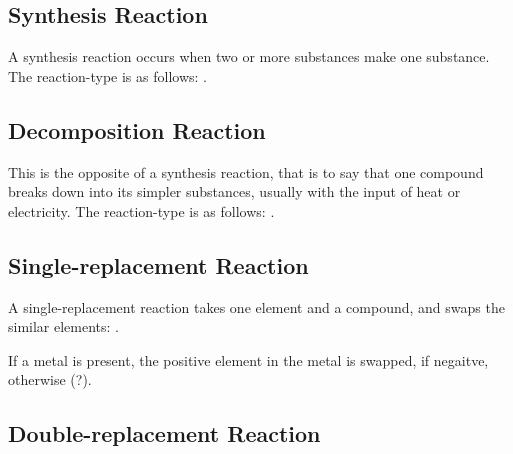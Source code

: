 \subsection{Synthesis Reaction}
A synthesis reaction occurs when two or more substances make one substance.  The
reaction-type is as follows: .

\subsection{Decomposition Reaction}
This is the opposite of a synthesis reaction, that is to say that one compound
breaks down into its simpler substances, usually with the input of heat or
electricity.  The reaction-type is as follows: .

\subsection{Single-replacement Reaction}
A single-replacement reaction takes one element and a compound, and swaps the
similar elements: .

If a metal is present, the positive element in the metal is swapped, if
negaitve, otherwise (?).

\subsection{Double-replacement Reaction}
